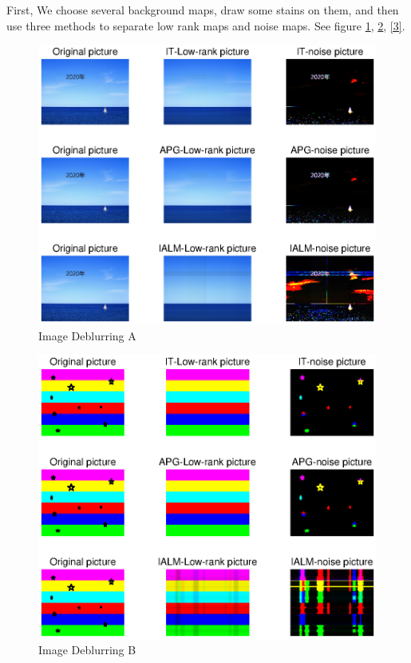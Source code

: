 \documentclass[UTF8]{report}
\begin{document}
First, We choose several background maps, draw some stains on them, and then use three methods to separate low rank maps and noise maps. See figure \ref{1}, \ref{2}, \ref{3}.
\begin{figure}
\centering
\includegraphics{Image Deblurring A.eps}
\caption{Image Deblurring A}
\label{1}
\end{figure}
\begin{figure}
\centering
\includegraphics{Image Deblurring B.eps}
\caption{Image Deblurring B}
\label{2}
\end{figure}
\end{document}
